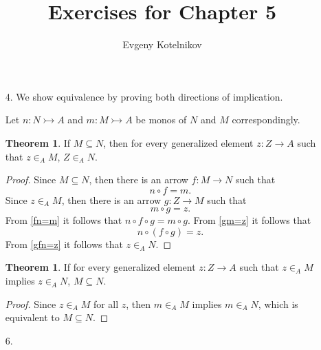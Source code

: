 \documentclass[12pt]{article}
\author{Evgeny Kotelnikov}
\title{Exercises for Chapter 5}
\date{}
\theoremstyle{definition}
\begin{document}
\maketitle

\begin{enumerate}
  \item[4.]
    We show equivalence by proving both directions of implication.

    Let $n : N \rightarrowtail A$ and $m : M \rightarrowtail A$ be monos of $N$ and $M$ correspondingly.

    \newtheorem*{a->b}{Theorem}
    \begin{a->b}If $M \subseteq N$, then for every generalized element $z : Z \to A$ such that $z \in_A M$, $Z \in_A N$.\end{a->b}
    \begin{proof}
      Since $M \subseteq N$, then there is an arrow $f : M \to N$ such that \begin{equation}\label{fn=m}n \circ f = m.\end{equation} Since $z \in_A M$, then there is an arrow $g : Z \to M$ such that \begin{equation}\label{gm=z}m \circ g = z.\end{equation}
      From \ref{fn=m} it follows that $n \circ f \circ g = m \circ g$. From \ref{gm=z} it follows that \begin{equation}\label{gfn=z}n \circ (f \circ g) = z.\end{equation}
      From \ref{gfn=z} it follows that $z \in_A N$.
    \end{proof}

    \newtheorem*{b->a}{Theorem}
    \begin{b->a}If for every generalized element $z : Z \to A$ such that $z \in_A M$ implies $z \in_A N$, $M \subseteq N$.\end{b->a}
    \begin{proof}
      Since $z \in_A M$ for all $z$, then $m \in_A M$ implies $m \in_A N$, which is equivalent to $M \subseteq N$.
    \end{proof}

  \item[6.]
    \begin{figure}[h!]
      \centering
\end{figure}
\end{enumerate}
\end{document}
